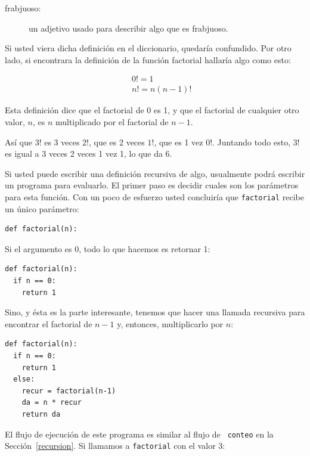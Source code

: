 \begin{description}

\item[frabjuoso:] un adjetivo usado para describir algo que es frabjuoso.

\end{description}


Si usted viera dicha definición en el diccionario, quedaría confundido.
Por otro lado, si encontrara la definición de la función factorial 
hallaría algo como esto:

\vspace{-0.35in}
\begin{eqnarray*}
&&  0! = 1 \\
&&  n! = n (n-1)!
\end{eqnarray*}
\vspace{-0.25in}

Esta definición dice que el factorial de 0 es 1, y que el factorial
de cualquier otro valor, $n$, es $n$ multiplicado por el factorial de $n-1$.

Así que $3!$ es 3 veces $2!$, que  es 2 veces $1!$, que es 1 vez
$0!$. Juntando todo esto, $3!$ es igual a 3 veces 2 veces 1 vez 1,
lo que da 6.


Si usted puede escribir una definición recursiva de algo, usualmente
podrá escribir un programa para evaluarlo. El primer paso es decidir
cuales son los parámetros para esta función. Con un poco de esfuerzo
usted concluiría que \texttt{factorial} recibe un único parámetro:

\beforeverb
\begin{verbatim}
def factorial(n):
\end{verbatim}
\afterverb
%
Si el argumento es 0, todo lo que hacemos es retornar 1:

\beforeverb
\begin{verbatim}
def factorial(n):
  if n == 0:
    return 1
\end{verbatim}
\afterverb
%
Sino, y ésta es la parte interesante, tenemos que hacer una
llamada recursiva para encontrar el factorial de $n-1$ y, entonces,  
multiplicarlo por $n$:

\beforeverb
\begin{verbatim}
def factorial(n):
  if n == 0:
    return 1
  else:
    recur = factorial(n-1)
    da = n * recur
    return da
\end{verbatim}
\afterverb
%
El flujo de ejecución de este programa es similar al flujo de {\tt
conteo} en la Sección~\ref{recursion}.  Si llamamos a \texttt{factorial} con 
el valor 3:

